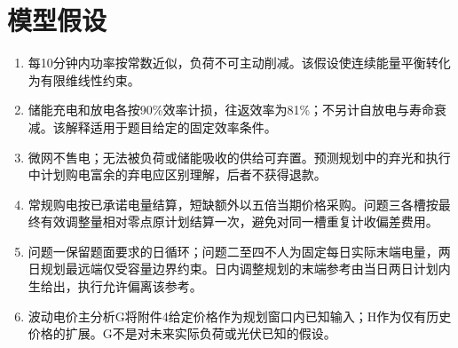 \section{模型假设}
\begin{enumerate}
\item 每10分钟内功率按常数近似，负荷不可主动削减。该假设使连续能量平衡转化为有限维线性约束。
\item 储能充电和放电各按90\%效率计损，往返效率为81\%；不另计自放电与寿命衰减。该解释适用于题目给定的固定效率条件。
\item 微网不售电；无法被负荷或储能吸收的供给可弃置。预测规划中的弃光和执行中计划购电富余的弃电应区别理解，后者不获得退款。
\item 常规购电按已承诺电量结算，短缺额外以五倍当期价格采购。问题三各槽按最终有效调整量相对零点原计划结算一次，避免对同一槽重复计收偏差费用。
\item 问题一保留题面要求的日循环；问题二至四不人为固定每日实际末端电量，两日规划最远端仅受容量边界约束。日内调整规划的末端参考由当日两日计划内生给出，执行允许偏离该参考。
\item 波动电价主分析G将附件4给定价格作为规划窗口内已知输入；H作为仅有历史价格的扩展。G不是对未来实际负荷或光伏已知的假设。
\end{enumerate}
